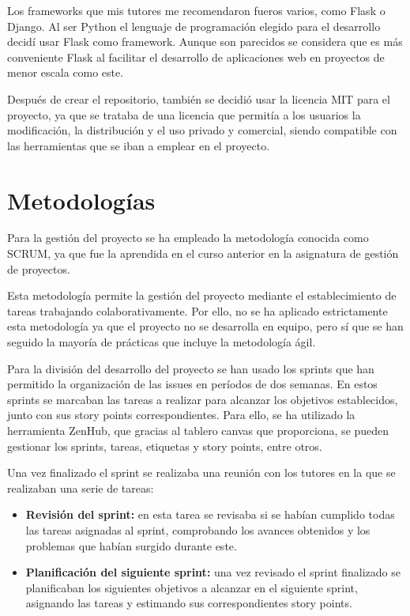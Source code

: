 Los frameworks que mis tutores me recomendaron fueros varios, como Flask o Django. Al ser Python el lenguaje de programación elegido para el desarrollo decidí usar Flask como framework. Aunque son parecidos se considera que es más conveniente Flask al facilitar el desarrollo de aplicaciones web en proyectos de menor escala como este.

Después de crear el repositorio, también se decidió usar la licencia MIT para el proyecto, ya que se trataba de una licencia que permitía a los usuarios la modificación, la distribución y el uso privado y comercial, siendo compatible con las herramientas que se iban a emplear en el proyecto.

\section{Metodologías}
Para la gestión del proyecto se ha empleado la metodología conocida como SCRUM, ya que fue la aprendida en el curso anterior en la asignatura de gestión de proyectos. 

Esta metodología permite la gestión del proyecto mediante el establecimiento de tareas trabajando colaborativamente. Por ello, no se ha aplicado estrictamente esta metodología ya que el proyecto no se desarrolla en equipo, pero sí que se han seguido la mayoría de prácticas que incluye la metodología ágil.

Para la división del desarrollo del proyecto se han usado los sprints que han permitido la organización de las issues en períodos de dos semanas. En estos sprints se marcaban las tareas a realizar para alcanzar los objetivos establecidos, junto con sus story points correspondientes. Para ello, se ha utilizado la herramienta ZenHub, que gracias al tablero canvas que proporciona, se pueden gestionar los sprints, tareas, etiquetas y story points, entre otros. 

Una vez finalizado el sprint se realizaba una reunión con los tutores en la que se realizaban una serie de tareas:
\begin{itemize}
\item \textbf{Revisión del sprint:} en esta tarea se revisaba si se habían cumplido todas las tareas asignadas al sprint, comprobando los avances obtenidos y los problemas que habían surgido durante este.
\item \textbf{Planificación del siguiente sprint:} una vez revisado el sprint finalizado se planificaban los siguientes objetivos a alcanzar en el siguiente sprint, asignando las tareas y estimando sus correspondientes story points.
\end{itemize}

